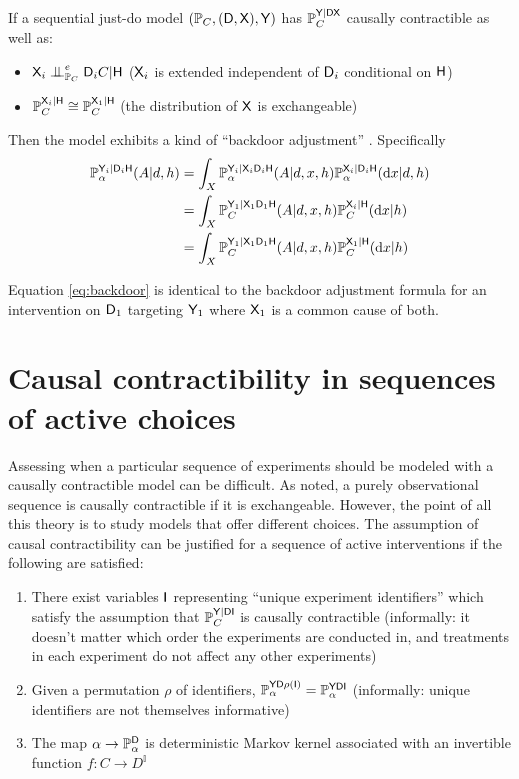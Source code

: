 If a sequential just-do model $(\mathbb{P}_C,(\mathsf{D},\mathsf{X}),\mathsf{Y})$ has $\mathbb{P}_C^{\mathsf{Y}|\mathsf{DX}}$ causally contractible as well as:
\begin{itemize}
    \item $\RV{X}_{i}\CI^e_{\prob{P}_C}\RV{D}_{i}C|\RV{H}$ ($\mathsf{X}_i$ is extended independent of $\mathsf{D}_i$ conditional on $\mathsf{H}$)
    \item $\mathbb{P}_C^{\mathsf{X}_{i}|\mathsf{H}}\cong \mathbb{P}_C^{\mathsf{X}_{1}|\mathsf{H}}$ (the distribution of $\mathsf{X}$ is exchangeable)
 \end{itemize}
Then the model exhibits a kind of ``backdoor adjustment'' \citet[Chap. 1]{pearl_causality:_2009}. Specifically
\begin{align}
    \mathbb{P}_\alpha^{\mathsf{Y}_{i}|\mathsf{D}_{i}\mathsf{H}}(A|d,h) &= \int_X \mathbb{P}_\alpha^{\mathsf{Y}_{i}|\mathsf{X}_{i}\mathsf{D}_{i}\mathsf{H}}(A|d,x,h)\mathbb{P}_\alpha^{\mathsf{X}_{i}|\mathsf{D}_{i}\mathsf{H}}(\mathrm{d}x|d,h)\\
    &= \int_X \mathbb{P}_C^{\mathsf{Y}_{1}|\mathsf{X}_{1}\mathsf{D}_{1}\mathsf{H}}(A|d,x,h)\mathbb{P}_C^{\mathsf{X}_{i}|\mathsf{H}}(\mathrm{d}x|h)\\
    &= \int_X \mathbb{P}_C^{\mathsf{Y}_{1}|\mathsf{X}_{1}\mathsf{D}_{1}\mathsf{H}}(A|d,x,h)\mathbb{P}_C^{\mathsf{X}_{1}|\mathsf{H}}(\mathrm{d}x|h)\label{eq:backdoor}
\end{align}

Equation \ref{eq:backdoor} is identical to the backdoor adjustment formula for an intervention on $\mathsf{D}_1$ targeting $\mathsf{Y}_1$ where $\mathsf{X}_1$ is a common cause of both.

\section{Causal contractibility in sequences of active choices}\label{sec:assessing}

Assessing when a particular sequence of experiments should be modeled with a causally contractible model can be difficult. As noted, a purely observational sequence is causally contractible if it is exchangeable. However, the point of all this theory is to study models that offer different choices. The assumption of causal contractibility can be justified for a sequence of active interventions if the following are satisfied:
\begin{enumerate}
    \item There exist variables $\mathsf{I}$ representing ``unique experiment identifiers'' which satisfy the assumption that $\mathbb{P}_C^{\mathsf{Y}|\mathsf{DI}}$ is causally contractible (informally: it doesn't matter which order the experiments are conducted in, and treatments in each experiment do not affect any other experiments)
    \item Given a permutation $\rho$ of identifiers, $\mathbb{P}_\alpha^{\mathsf{YD}\rho(\mathsf{I})}=\mathbb{P}_\alpha^{\mathsf{YDI}}$ (informally: unique identifiers are not themselves informative)
    \item The map $\alpha\to \mathbb{P}_\alpha^{\mathsf{D}}$ is deterministic Markov kernel associated with an invertible function $f:C\to D^{\mathbb{I}}$
\end{enumerate}

